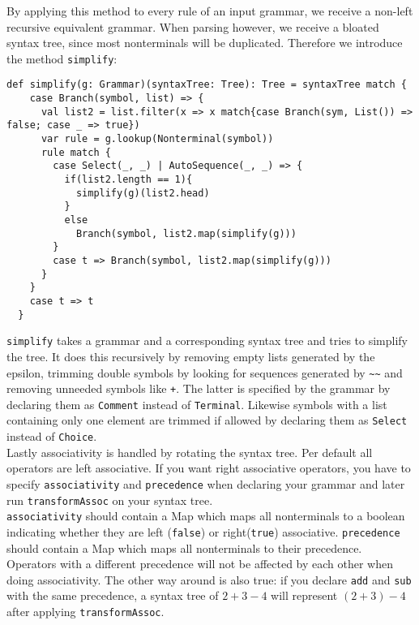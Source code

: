 \documentclass{article}
\begin{document}
By applying this method to every rule of an input grammar, we receive a non-left recursive equivalent grammar. When parsing however, we receive a bloated syntax tree, since most nonterminals will be duplicated. Therefore we introduce the method \verb|simplify|:
\begin{lstlisting}
def simplify(g: Grammar)(syntaxTree: Tree): Tree = syntaxTree match {
    case Branch(symbol, list) => {
      val list2 = list.filter(x => x match{case Branch(sym, List()) => false; case _ => true})
      var rule = g.lookup(Nonterminal(symbol))
      rule match {
        case Select(_, _) | AutoSequence(_, _) => {
          if(list2.length == 1){
            simplify(g)(list2.head)
          }
          else
            Branch(symbol, list2.map(simplify(g)))
        }
        case t => Branch(symbol, list2.map(simplify(g)))
      }
    }
    case t => t 
  }
\end{lstlisting}
\verb|simplify| takes a grammar and a corresponding syntax tree and tries to simplify the tree. It does this recursively by removing empty lists generated by the epsilon, trimming double symbols by looking for sequences generated by \verb|~~| and removing unneeded symbols like  \verb|+|. The latter is specified by the grammar by declaring them as \verb|Comment| instead of \verb|Terminal|. Likewise symbols with a list containing only one element are trimmed if allowed by declaring them as \verb|Select| instead of \verb|Choice|.\\
Lastly associativity is handled by rotating the syntax tree. Per default all operators are left associative. If you want right associative operators, you have to specify \verb|associativity| and \verb|precedence| when declaring your grammar and later run \verb|transformAssoc| on your syntax tree.\\
\verb|associativity| should contain a Map which maps all nonterminals to a boolean indicating whether they are left (\verb|false|) or right(\verb|true|) associative.
\verb|precedence| should contain a Map which maps all nonterminals to their precedence. Operators with a different precedence will not be affected by each other when doing associativity. The other way around is also true: if you declare \verb|add| and \verb|sub| with the same precedence, a syntax tree of $2+3-4$ will represent $(2+3)-4$ after applying \verb|transformAssoc|.
\end{document}
